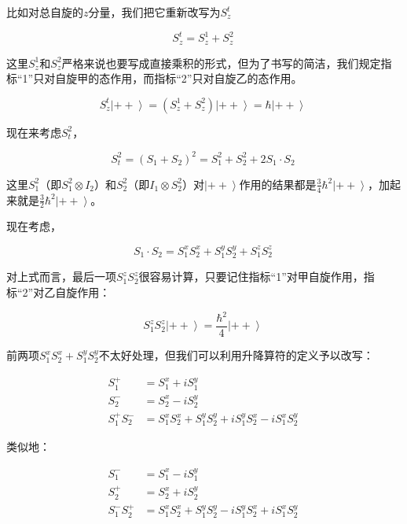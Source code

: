 比如对总自旋的$z$分量，我们把它重新改写为$S_z^t$

\begin{equation}
S_z^t = S_z^1 + S_z^2~
\end{equation}

这里$S_z^1$和$S_z^2$严格来说也要写成直接乘积的形式，但为了书写的简洁，我们规定指标“1”只对自旋甲的态作用，而指标“2”只对自旋乙的态作用。

\begin{equation}
S_z^t \left| ++ \right\rangle = \left( S_z^1 + S_z^2 \right) \left| ++ \right\rangle = \hbar \left| ++ \right\rangle~
\end{equation}

现在来考虑$S_t^2$，

\begin{equation}
S_t^2 = \left( S_1 + S_2 \right)^2 = S_1^2 + S_2^2 + 2 S_1 \cdot S_2~
\end{equation}

这里$S_1^2$（即$S_1^2 \otimes I_2 $）和$S_2^2$（即$I_1 \otimes S_2^2$）对$\left| ++ \right\rangle$作用的结果都是$\frac{3}{4} \hbar^2 \left| ++ \right\rangle $，加起来就是$\frac{3}{2} \hbar^2 \left| ++ \right\rangle  $。

现在考虑，

\begin{equation}
S_1 \cdot S_2 = S_1^x  S_2^x + S_1^y S_2^y + S_1^z S_2^z~
\end{equation}

对上式而言，最后一项$S_1^z S_2^z$很容易计算，只要记住指标“1”对甲自旋作用，指标“2”对乙自旋作用：

\begin{equation}
S_1^z S_2^z \left| ++ \right\rangle = \frac{\hbar^2}{4} \left| ++ \right\rangle ~
\end{equation}

前两项$S_1^x S_2^x + S_1^y S_2^y$不太好处理，但我们可以利用升降算符的定义予以改写：

\begin{align}
S_1^+ &= S_1^x + i S_1^y \\
S_2^- &= S_2^x - i S_2^y \\
S_1^+ S_2^- &= S_1^x S_2^x + S_1^y S_2^y + i S_1^y S_2^x - i S_1^x S_2^y~
\end{align}

类似地：

\begin{align}
S_1^- &= S_1^x - i S_1^y \\
S_2^+ &= S_2^x + i S_2^y \\
S_1^- S_2^+ &= S_1^x S_2^x + S_1^y S_2^y - i S_1^y S_2^x + i S_1^x S_2^y~
\end{align}

